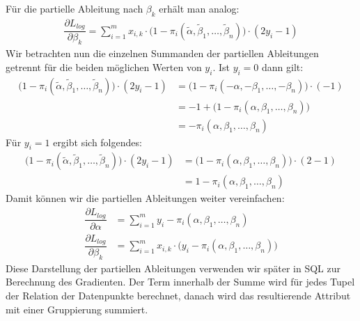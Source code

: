 Für die partielle Ableitung nach $\beta_k$ erhält man analog:
\begin{align*}
    \dfrac{\partial L_{log}}{\partial \beta_k} = \sum_{i=1}^m x_{i, k} \cdot \big(1 - \pi_i(\tilde\alpha, \tilde\beta_1, \dots, \tilde\beta_n) \big) \cdot (2 y_i - 1)
\end{align*}
Wir betrachten nun die einzelnen Summanden der partiellen Ableitungen getrennt für die beiden möglichen Werten von $y_i$. Ist $y_i = 0$ dann gilt:
\begin{align*}
    \big(1 - \pi_i(\tilde\alpha, \tilde\beta_1, \dots, \tilde\beta_n) \big) \cdot (2 y_i - 1) &= \big(1 - \pi_i(- \alpha, - \beta_1, \dots, - \beta_n) \big) \cdot (- 1) \\
    &= - 1 + \big(1 - \pi_i(\alpha, \beta_1, \dots, \beta_n) \big) \\
    &= - \pi_i(\alpha, \beta_1, \dots, \beta_n)
\end{align*}
Für $y_i = 1$ ergibt sich folgendes:
\begin{align*}
    \big(1 - \pi_i(\tilde\alpha, \tilde\beta_1, \dots, \tilde\beta_n) \big) \cdot (2 y_i - 1) &= \big(1 - \pi_i(\alpha, \beta_1, \dots, \beta_n) \big) \cdot (2 - 1) \\
    &= 1 - \pi_i(\alpha, \beta_1, \dots, \beta_n)
\end{align*}
Damit können wir die partiellen Ableitungen weiter vereinfachen:
\begin{align*}
    \dfrac{\partial L_{log}}{\partial \alpha} &= \sum_{i=1}^m y_i - \pi_i(\alpha, \beta_1, \dots, \beta_n) \\
    \dfrac{\partial L_{log}}{\partial \beta_k} &= \sum_{i=1}^m x_{i, k} \cdot \big(y_i - \pi_i(\alpha, \beta_1, \dots, \beta_n) \big)
\end{align*}
Diese Darstellung der partiellen Ableitungen verwenden wir später in SQL zur Berechnung des Gradienten. Der Term innerhalb der Summe wird für jedes Tupel der Relation der Datenpunkte berechnet, danach wird das resultierende Attribut mit einer Gruppierung summiert.
